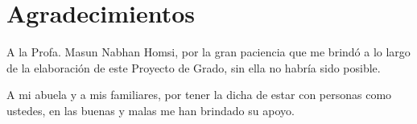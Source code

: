 \chapter*{Agradecimientos}

A la Profa. Masun Nabhan Homsi, por la gran paciencia que me brindó a lo largo de la
elaboración de este Proyecto de Grado, sin ella no habría sido posible.

A mi abuela y a mis familiares,
por tener la dicha de estar con personas como ustedes,
en las buenas y malas me han brindado su apoyo.